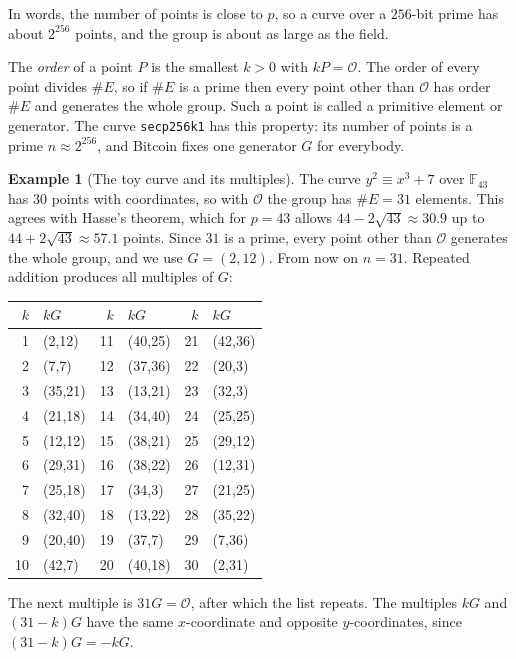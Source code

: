 \documentclass[11pt,a4paper]{article}
\theoremstyle{definition}
\newtheorem{example}[definition]{Example}
\newcommand{\F}{\mathbb{F}}
\begin{document}
In words, the number of points is close to $p$, so a curve over a $256$-bit prime has about $2^{256}$ points, and the group is about as large as the field.

The \emph{order} of a point $P$ is the smallest $k>0$ with $kP=\mathcal{O}$. The order of every point divides $\#E$, so if $\#E$ is a prime then every point other than $\mathcal{O}$ has order $\#E$ and generates the whole group. Such a point is called a primitive element or generator. The curve \texttt{secp256k1} has this property: its number of points is a prime $n\approx 2^{256}$, and Bitcoin fixes one generator $G$ for everybody.

\begin{example}[The toy curve and its multiples]\label{ex:curve}
The curve $y^2\equiv x^3+7$ over $\F_{43}$ has $30$ points with coordinates, so with $\mathcal{O}$ the group has $\#E=31$ elements. This agrees with Hasse's theorem, which for $p=43$ allows $44-2\sqrt{43}\approx 30.9$ up to $44+2\sqrt{43}\approx 57.1$ points. Since $31$ is a prime, every point other than $\mathcal{O}$ generates the whole group, and we use $G=(2,12)$. From now on $n=31$. Repeated addition produces all multiples of $G$:
\begin{center}\small
\begin{tabular}{rl@{\qquad}rl@{\qquad}rl}
\toprule
$k$ & $kG$ & $k$ & $kG$ & $k$ & $kG$\\
\midrule
1 & (2,12) & 11 & (40,25) & 21 & (42,36)\\
2 & (7,7) & 12 & (37,36) & 22 & (20,3)\\
3 & (35,21) & 13 & (13,21) & 23 & (32,3)\\
4 & (21,18) & 14 & (34,40) & 24 & (25,25)\\
5 & (12,12) & 15 & (38,21) & 25 & (29,12)\\
6 & (29,31) & 16 & (38,22) & 26 & (12,31)\\
7 & (25,18) & 17 & (34,3) & 27 & (21,25)\\
8 & (32,40) & 18 & (13,22) & 28 & (35,22)\\
9 & (20,40) & 19 & (37,7) & 29 & (7,36)\\
10 & (42,7) & 20 & (40,18) & 30 & (2,31)\\
\bottomrule
\end{tabular}
\end{center}
The next multiple is $31G=\mathcal{O}$, after which the list repeats. The multiples $kG$ and $(31-k)G$ have the same $x$-coordinate and opposite $y$-coordinates, since $(31-k)G=-kG$.
\end{example}
\end{document}
